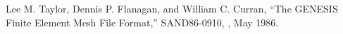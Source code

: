 Lee M. Taylor, Dennis P. Flanagan, and William C. Curran,
``The GENESIS Finite Element Mesh File Format,''
SAND86-0910, \SNLA, May 1986.

